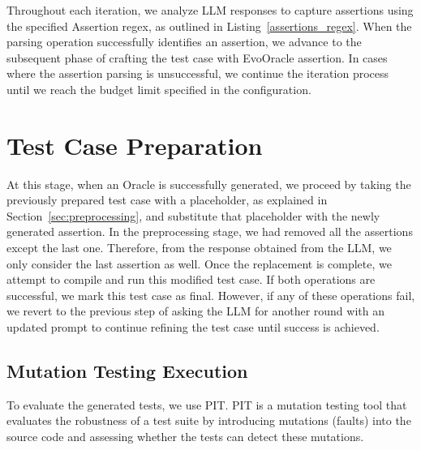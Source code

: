             

Throughout each iteration, we analyze LLM responses to capture assertions using the specified Assertion regex, as outlined in Listing~\ref{assertions_regex}. When the parsing operation successfully identifies an assertion, we advance to the subsequent phase of crafting the test case with EvoOracle assertion. In cases where the assertion parsing is unsuccessful, we continue the iteration process until we reach the budget limit specified in the configuration. 

\section{Test Case Preparation}
\label{sec:test_case_preparation}
\vspace{0.2 cm}

At this stage, when an Oracle is successfully generated, we proceed by taking the previously prepared test case with a placeholder, as explained in Section~\ref{sec:preprocessing}, and substitute that placeholder with the newly generated assertion. In the preprocessing stage, we had removed all the assertions except the last one. Therefore, from the response obtained from the LLM, we only consider the last assertion as well. Once the replacement is complete, we attempt to compile and run this modified test case. If both operations are successful, we mark this test case as final. However, if any of these operations fail, we revert to the previous step of asking the LLM for another round with an updated prompt to continue refining the test case until success is achieved.

\vspace{0.1 cm}
\subsection{Mutation Testing Execution}
\label{sec:mutation_testing_execution}
\vspace{0.1 cm}

To evaluate the generated tests, we use PIT\cite{noauthor_pit_nodate}. PIT is a mutation testing tool that evaluates the robustness of a test suite by introducing mutations (faults) into the source code and assessing whether the tests can detect these mutations.

